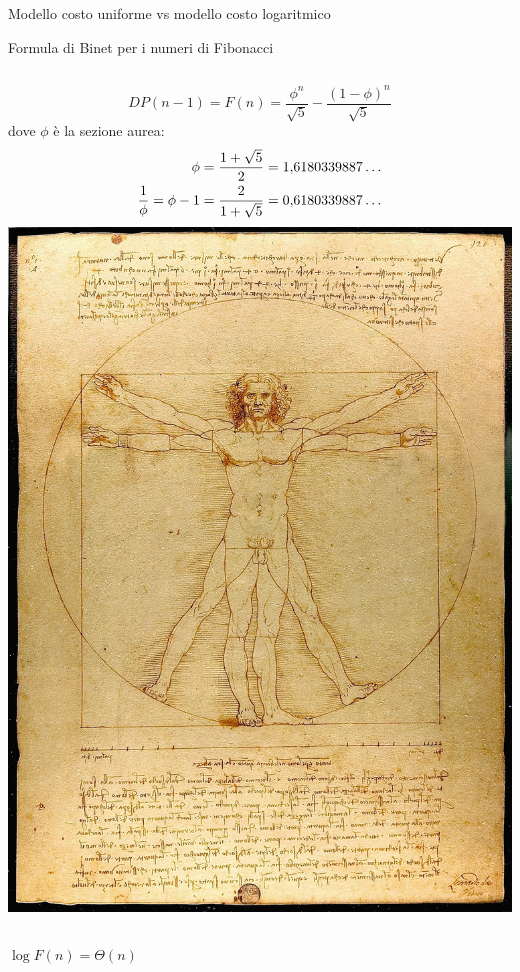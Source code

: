 \begin{frame}{Modello costo uniforme vs modello costo logaritmico}

\begin{block}{Formula di Binet per i numeri di Fibonacci}
\vspace{6pt}
\begin{columns}[T]
\[
DP(n-1) = F(n) = \frac{\phi^n}{\sqrt{5}} - \frac{(1-\phi)^n}{\sqrt{5}} 
\]
dove $\phi$ è la \alert{sezione aurea}:
\begin{align*}
\phi &={1+\sqrt 5 \over 2}=1{,}6180339887\dots  \\
\frac{1}{\phi} = \phi - 1 & ={2 \over 1+\sqrt 5 }=0{,}6180339887\dots 
\end{align*}
\includegraphics[width=\textwidth]{vitruviano.jpg}
\end{columns}
\end{block}


\bigskip
\begin{columns}
\vspace{-6pt}
\pause
{}

\bigskip
\alert{$\log F(n) = \Theta(n)$}
\end{columns}

\end{frame}

